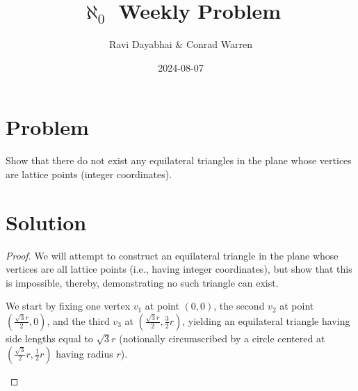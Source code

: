 \documentclass{article}
\title{$\aleph_{0}$ Weekly Problem}
\author{Ravi Dayabhai \& Conrad Warren}
\date{2024-08-07}
\begin{document}
\maketitle

\section*{Problem}

Show that there do not exist any equilateral triangles in the plane whose vertices are lattice points (integer coordinates).

\section*{Solution}

\begin{proof}

We will attempt to construct an equilateral triangle in the plane whose vertices are all lattice points (i.e., having integer coordinates), but show that this is impossible, thereby, demonstrating no such triangle can exist.

We start by fixing one vertex $v_{1}$ at point $(0, 0)$, the second $v_{2}$ at point $(\frac{\sqrt{3}r}{2}, 0)$, and the third $v_{3}$ at $(\frac{\sqrt{3}r}{2}, \frac{3}{2}r)$, yielding an equilateral triangle having side lengths equal to $\sqrt{3}r$ (notionally circumscribed by a circle centered at $(\frac{\sqrt{3}}{2}r, \frac{1}{2}r)$ having radius $r$).

\begin{figure}[H]
    \centering
\end{figure}
\end{proof}
\end{document}
